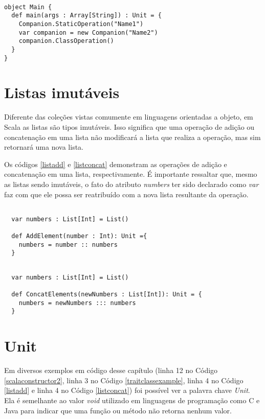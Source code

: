 \begin{lstlisting}[caption={Chamada de operações de um \textit{companion object}.},label=coexample2]

object Main {
  def main(args : Array[String]) : Unit = {
    Companion.StaticOperation("Name1")
    var companion = new Companion("Name2")
    companion.ClassOperation()
  }
}

\end{lstlisting}

\section{Listas imutáveis}

Diferente das coleções vistas comumente em linguagens 
orientadas a objeto, em Scala as listas são tipos 
imutáveis. Isso significa que uma operação de adição 
ou concatenação em uma lista não modificará a lista 
que realiza a operação, mas sim retornará uma nova 
lista\cite{ordesky2008}. 

Os códigos \ref{listadd} e \ref{listconcat} demonstram 
as operações de adição e concatenação em uma lista, 
respectivamente. É importante ressaltar que, mesmo 
as listas sendo imutáveis, o fato do 
atributo \textit{numbers} ter sido declarado como \textit{var} 
faz com que ele possa ser reatribuído com a nova lista 
resultante da operação.

\begin{lstlisting}[caption={Exemplo de adição em uma lista imutável.},label=listadd]

  var numbers : List[Int] = List()
  
  def AddElement(number : Int): Unit ={
    numbers = number :: numbers
  }

\end{lstlisting}

\begin{lstlisting}[caption={Exemplo de concatenação em uma lista imutável.},label=listconcat]

  var numbers : List[Int] = List()
  
  def ConcatElements(newNumbers : List[Int]): Unit = {
    numbers = newNumbers ::: numbers
  }    

\end{lstlisting}

\section{Unit}

Em diversos exemplos em código desse capítulo 
(linha 12 no Código \ref{scalaconstructor2}, linha 3 no Código 
\ref{traitclassexample}, linha 4 no Código 
\ref{listadd} e linha 4 no Código \ref{listconcat}) 
foi possível ver a palavra chave \textit{Unit}. Ela é semelhante ao 
valor \textit{void} utilizado em linguagens de programação como C e 
Java para indicar que uma função ou método não retorna 
nenhum valor\cite{wampler2021}.
